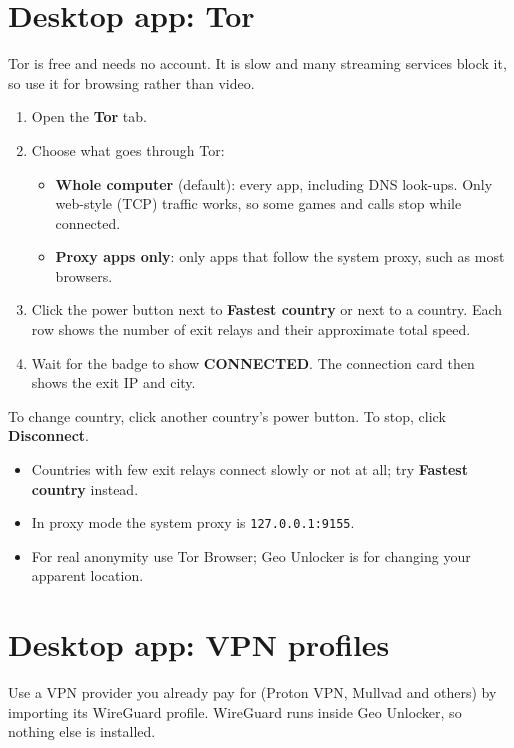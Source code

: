 \documentclass[11pt,a4paper]{article}
\newcommand{\ui}[1]{\textbf{#1}}            %
\newcommand{\file}[1]{\texttt{#1}}          %
\begin{document}
\section{Desktop app: Tor}

Tor is free and needs no account. It is slow and many streaming services block it, so use it for browsing rather than video.

\begin{enumerate}
  \item Open the \ui{Tor} tab.
  \item Choose what goes through Tor:
    \begin{itemize}
      \item \ui{Whole computer} (default): every app, including DNS look-ups. Only web-style (TCP) traffic works, so some games and calls stop while connected.
      \item \ui{Proxy apps only}: only apps that follow the system proxy, such as most browsers.
    \end{itemize}
  \item Click the power button next to \ui{Fastest country} or next to a country. Each row shows the number of exit relays and their approximate total speed.
  \item Wait for the badge to show \ui{CONNECTED}. The connection card then shows the exit IP and city.
\end{enumerate}

To change country, click another country's power button. To stop, click \ui{Disconnect}.

\begin{itemize}
  \item Countries with few exit relays connect slowly or not at all; try \ui{Fastest country} instead.
  \item In proxy mode the system proxy is \file{127.0.0.1:9155}.
  \item For real anonymity use Tor Browser; Geo Unlocker is for changing your apparent location.
\end{itemize}

\section{Desktop app: VPN profiles}

Use a VPN provider you already pay for (Proton VPN, Mullvad and others) by importing its WireGuard profile. WireGuard runs inside Geo Unlocker, so nothing else is installed.
\end{document}
